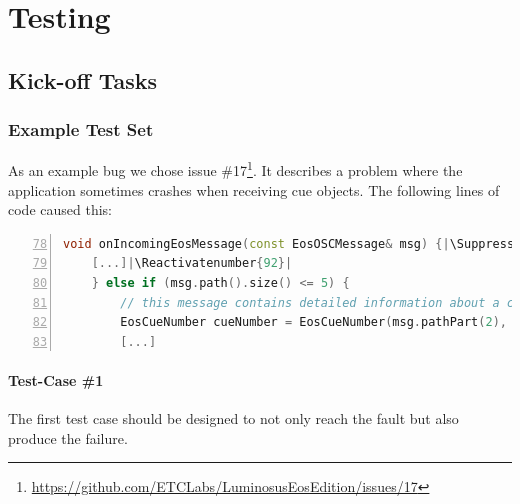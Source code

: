 \documentclass{scrreprt}
\makeatletter
\let\origthelstnumber\thelstnumber
\newcommand*\Suppressnumber{%
	\lst@AddToHook{OnNewLine}{%
		\let\thelstnumber\relax%
		\advance\c@lstnumber-\@ne\relax%
	}%
}
\newcommand*\Reactivatenumber[1]{%
	\setcounter{lstnumber}{\numexpr#1-1\relax}
	\lst@AddToHook{OnNewLine}{%
		\let\thelstnumber\origthelstnumber%
		\refstepcounter{lstnumber}
	}%
}
\makeatother
\begin{document}
\chapter{Testing}

\section{Kick-off Tasks}

\subsection{Example Test Set}

As an example bug we chose issue \#17\footnote{\url{https://github.com/ETCLabs/LuminosusEosEdition/issues/17}}. It describes a problem where the application sometimes crashes when receiving cue objects. The following lines of code caused this:

\bigskip
\begin{lstlisting}[language=C++,
							numbers=left,
							firstnumber=78,
							directivestyle={\color{black}}
							emph={int,char,double,float,unsigned},
							emphstyle={\color{blue}},
							title=src/OSCNetworkManager.cpp]
void onIncomingEosMessage(const EosOSCMessage& msg) {|\Suppressnumber|
    [...]|\Reactivatenumber{92}|
    } else if (msg.path().size() <= 5) {
        // this message contains detailed information about a cue
        EosCueNumber cueNumber = EosCueNumber(msg.pathPart(2), msg.pathPart(3), msg.pathPart(4));|\Suppressnumber|
        [...]
\end{lstlisting}
\bigskip

\subsubsection{Test-Case \#1}
\label{test-case-1}

The first test case should be designed to not only reach the fault but also produce the failure.
\end{document}
